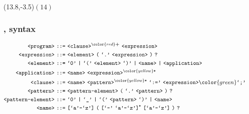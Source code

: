 \begin{frame}

\begin{textblock}{1}(13.8,-3.5)$(14)$\end{textblock}

\frametitle{\D{}, syntax}

\begin{align*}
\nonterm{program}\ \textt{::=}&\ \nonterm{clause}^{\color{red}\textt{\bf +}}
\ \nonterm{expression}
& \\
\nonterm{expression}\ \textt{::=}&\ \nonterm{element}\ \textt{(}\ \term{.}
\ \nonterm{expression}\ \textt{)}\ \textt{?}
& \\
\nonterm{element}\ \textt{::=}&\ \term{0}\ \textt{|}\ \term{(}
\ \nonterm{element}\ \term{)}\ \textt{|}\ \nonterm{name}\ \textt{|}
\ \nonterm{application}
& \\
\nonterm{application}\ \textt{::=}&\ \nonterm{name}
\ \nonterm{expression}^{\color{yellow}\textt{*}}
& \\
\nonterm{clause}\ \textt{::=}&\ \nonterm{name}
\ \nonterm{pattern}^{\color{yellow}\textt{*}}\ \term{:=}
\ \nonterm{expression}{\color{green}\term{;}}
& \\
\nonterm{pattern}\ \textt{::=}&\ \nonterm{pattern-element}\ \textt{(}
\ \term{.}\ \nonterm{pattern}\ \textt{)}\ \textt{?}
& \\
\nonterm{pattern-element}\ \textt{::=}&\ \term{0}\ \textt{|}\ \term{\_}
\ \textt{|}\ \term{(}\ \nonterm{pattern}\ \term{)}\ \textt{|}\ \nonterm{name}
& \\
\nonterm{name}\ \textt{::=}&\ \textt{[}\term{a}\mathmono{-}\term{z}\textt{]}
\ \textt{(}\ \textt{[}\term{-}\ \term{a}\mathmono{-}\term{z}\textt{]}^\textt{*}
\ \textt{[}\term{a}\mathmono{-}\term{z}\textt{]}\ \textt{)}\ \textt{?}
\end{align*}




\end{frame}

